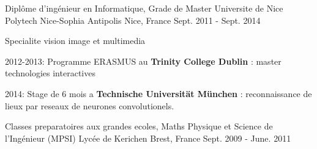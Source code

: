 \begin{cventries}
  \cventry
    {Diplôme d'ingénieur en Informatique, Grade de Master} %
    {Universite de Nice Polytech Nice-Sophia Antipolis} %
    {Nice, France} %
    {Sept. 2011 - Sept. 2014} %
    {
      \begin{cvitems} %
        \item Specialite vision image et multimedia
        \item 2012-2013: Programme ERASMUS au \textbf{Trinity College Dublin} : master technologies interactives
        \item 2014: Stage de 6 mois a \textbf{Technische Universität München} : reconnaissance de lieux par reseaux de neurones convolutionels.
      \end{cvitems}
    }


  \cventry
    {Classes preparatoires aux grandes ecoles, Maths Physique et Science de l'Ingénieur (MPSI)} %
    {Lycée de Kerichen} %
    {Brest, France} %
    {Sept. 2009 - June. 2011} %
    {}
\end{cventries}
